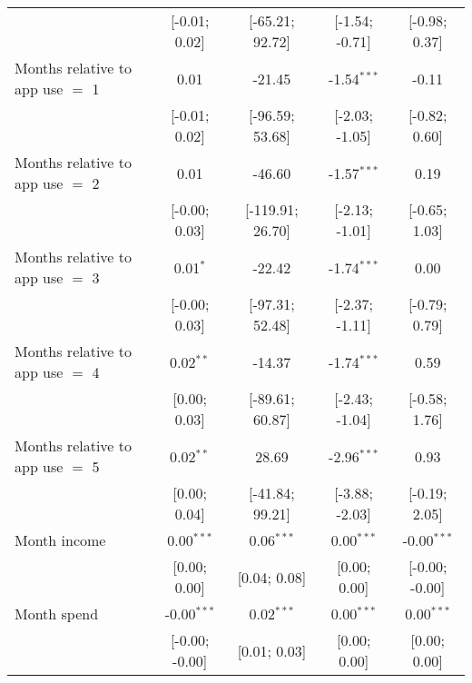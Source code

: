 \begin{table}[htbp]
\begin{threeparttable}[b]
\begin{tabular}{lcccc}
                                           & [-0.01; 0.02]            & [-65.21; 92.72]      & [-1.54; -0.71]           & [-0.98; 0.37]\\   
         Months relative to app use $=$ 1  & 0.01                     & -21.45               & -1.54$^{***}$            & -0.11\\   
                                           & [-0.01; 0.02]            & [-96.59; 53.68]      & [-2.03; -1.05]           & [-0.82; 0.60]\\   
         Months relative to app use $=$ 2  & 0.01                     & -46.60               & -1.57$^{***}$            & 0.19\\   
                                           & [-0.00; 0.03]            & [-119.91; 26.70]     & [-2.13; -1.01]           & [-0.65; 1.03]\\   
         Months relative to app use $=$ 3  & 0.01$^{*}$               & -22.42               & -1.74$^{***}$            & 0.00\\   
                                           & [-0.00; 0.03]            & [-97.31; 52.48]      & [-2.37; -1.11]           & [-0.79; 0.79]\\   
         Months relative to app use $=$ 4  & 0.02$^{**}$              & -14.37               & -1.74$^{***}$            & 0.59\\   
                                           & [0.00; 0.03]             & [-89.61; 60.87]      & [-2.43; -1.04]           & [-0.58; 1.76]\\   
         Months relative to app use $=$ 5  & 0.02$^{**}$              & 28.69                & -2.96$^{***}$            & 0.93\\   
                                           & [0.00; 0.04]             & [-41.84; 99.21]      & [-3.88; -2.03]           & [-0.19; 2.05]\\   
         Month income                      & 0.00$^{***}$             & 0.06$^{***}$         & 0.00$^{***}$             & -0.00$^{***}$\\   
                                           & [0.00; 0.00]             & [0.04; 0.08]         & [0.00; 0.00]             & [-0.00; -0.00]\\   
         Month spend                       & -0.00$^{***}$            & 0.02$^{***}$         & 0.00$^{***}$             & 0.00$^{***}$\\   
                                           & [-0.00; -0.00]           & [0.01; 0.03]         & [0.00; 0.00]             & [0.00; 0.00]\\   

\end{tabular}
\end{threeparttable}
\end{table}
